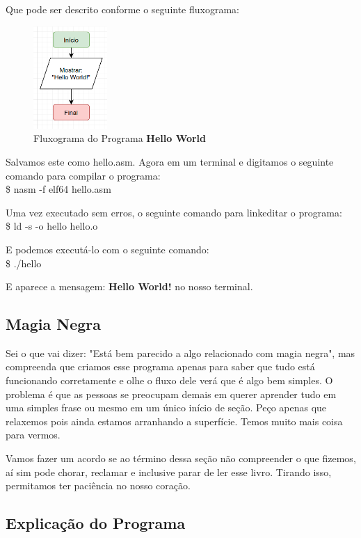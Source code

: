 Que pode ser descrito conforme o seguinte fluxograma:
\begin{figure}[H]
	\centering
	\includegraphics[width=0.25\textwidth]{Pictures/cap01/programa11}
	\caption{Fluxograma do Programa \textbf{Hello World}}
\end{figure}

Salvamos este como hello.asm. Agora em um terminal e digitamos o seguinte comando para compilar o programa: \\
{\ttfamily\$ nasm -f elf64 hello.asm}

Uma vez executado sem erros, o seguinte comando para linkeditar o programa: \\
{\ttfamily\$ ld -s -o hello hello.o}

E podemos executá-lo com o seguinte comando: \\
{\ttfamily\$ ./hello}

E aparece a mensagem: \textbf{Hello World!} no nosso terminal.

\subsection{Magia Negra}

Sei o que vai dizer: "Está bem parecido a algo relacionado com magia negra", mas compreenda que criamos esse programa apenas para saber que tudo está funcionando corretamente e olhe o fluxo dele verá que é algo bem simples. O problema é que as pessoas se preocupam demais em querer aprender tudo em uma simples frase ou mesmo em um único início de seção. Peço apenas que relaxemos pois ainda estamos arranhando a superfície. Temos muito mais coisa para vermos.

Vamos fazer um acordo se ao término dessa seção não compreender o que fizemos, aí sim pode chorar, reclamar e inclusive parar de ler esse livro. Tirando isso, permitamos ter paciência no nosso coração.

\subsection{Explicação do Programa}

